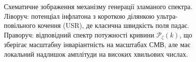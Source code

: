 \begin{figure}[htbp]
  \caption{Схематичне зображення механізму генерації зламаного спектра.
           Ліворуч: потенціал інфлатона з короткою ділянкою ультра-повільного кочення (USR),
           де класична швидкість поля падає. Праворуч: відповідний спектр потужності кривини
           $\mathcal{P}_\zeta(k)$, що зберігає масштабну інваріантність на масштабах СМВ,
           але має локальний надлишок амплітуди на високих хвильових числах.}
  \label{fig:jwst_feature}
\end{figure}
